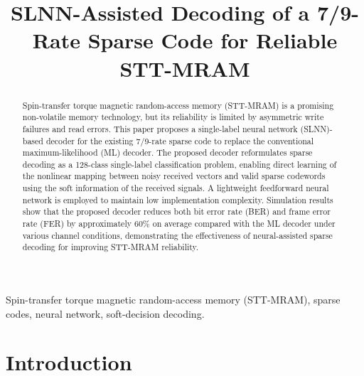 \documentclass[conference]{IEEEtran}
\begin{document}
\title{SLNN-Assisted Decoding of a 7/9-Rate Sparse Code for Reliable STT-MRAM}


\author{


}

\maketitle

\begin{abstract}

Spin-transfer torque magnetic random-access memory (STT-MRAM) is a promising non-volatile memory technology, but its reliability is limited by asymmetric write failures and read errors. This paper proposes a single-label neural network (SLNN)-based decoder for the existing 7/9-rate sparse code to replace the conventional maximum-likelihood (ML) decoder. The proposed decoder reformulates sparse decoding as a 128-class single-label classification problem, enabling direct learning of the nonlinear mapping between noisy received vectors and valid sparse codewords using the soft information of the received signals. A lightweight feedforward neural network is employed to maintain low implementation complexity. Simulation results show that the proposed decoder reduces both bit error rate (BER) and frame error rate (FER) by approximately 60\% on average compared with the ML decoder under various channel conditions, demonstrating the effectiveness of neural-assisted sparse decoding for improving STT-MRAM reliability.

\end{abstract}

\begin{IEEEkeywords}
Spin-transfer torque magnetic random-access memory (STT-MRAM), sparse codes, neural network, soft-decision decoding.
\end{IEEEkeywords}



\section{Introduction}
\end{document}
